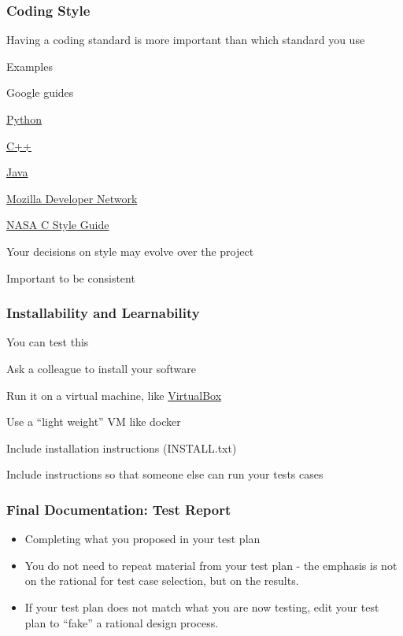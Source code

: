 \documentclass[t,12pt,numbers,fleqn]{beamer}
\begin{document}

\begin{frame}
\frametitle{Coding Style}

\bi
\item Having a coding standard is more important than which standard you use
\item Examples
\bi
\item Google guides
\bi
\item \href{https://google.github.io/styleguide/pyguide.html}{Python}
\item \href{https://google.github.io/styleguide/cppguide.html}{C++}
\item \href{https://google.github.io/styleguide/javaguide.html}{Java}
\ei
\item
  \href{https://developer.mozilla.org/en-US/docs/Mozilla/Developer_guide/Coding_Style}{Mozilla
    Developer Network}
\item \href{http://homepages.inf.ed.ac.uk/dts/pm/Papers/nasa-c-style.pdf}{NASA C
    Style Guide}
\ei
\item Your decisions on style may evolve over the project
\item Important to be consistent
\ei

\end{frame}


\begin{frame}
\frametitle{Installability and Learnability}

\bi
\item You can test this
\item Ask a colleague to install your software
\item Run it on a virtual machine, like
  \href{https://www.virtualbox.org/}{VirtualBox}
\item Use a ``light weight'' VM like docker
\item Include installation instructions (INSTALL.txt)
\item Include instructions so that someone else can run your tests cases
\ei

\end{frame}


\begin{frame}
\frametitle{Final Documentation: Test Report}
\begin{itemize}
\item Completing what you proposed in your test plan
\item You do not need to repeat material from your test plan - the emphasis is
  not on the rational for test case selection, but on the results.
\item If your test plan does not match what you are now testing, edit your test
  plan to ``fake'' a rational design process.
\end{itemize}
\end{frame}
\end{document}
